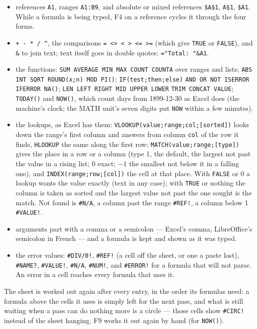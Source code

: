 \begin{itemize}\itemsep0pt
\item references \verb|A1|, ranges \verb|A1:B9|, and absolute or mixed
  references \verb|$A$1|, \verb|A$1|, \verb|$A1|. While a formula is being
  typed, F4 on a reference cycles it through the four forms.
\item \verb|+ - * / ^|, the comparisons \verb|= <> < > <= >=| (which give
  \verb|TRUE| or \verb|FALSE|), and \verb|&| to join text; text itself goes
  in double quotes: \verb|="Total: "&A1|.
\item the functions: \verb|SUM AVERAGE MIN MAX COUNT COUNTA| over ranges
  and lists; \verb|ABS INT SQRT ROUND(x;n) MOD PI()|; \verb|IF(test;then;else)|
  \verb|AND OR NOT ISERROR IFERROR NA()|; \verb|LEN LEFT RIGHT MID UPPER LOWER|
  \verb|TRIM CONCAT VALUE|; \verb|TODAY()| and \verb|NOW()|, which count days
  from 1899-12-30 as Excel does (the machine's clock; the MATH unit's seven
  digits put \verb|NOW| within a few minutes).
\item the lookups, as Excel has them: \verb|VLOOKUP(value;range;col;[sorted])|
  looks down the range's first column and answers from column \verb|col|
  of the row it finds, \verb|HLOOKUP| the same along the first row;
  \verb|MATCH(value;range;[type])| gives the place in a row or a column
  (type 1, the default, the largest not past the value in a rising list;
  0 exact; $-1$ the smallest not below it in a falling one), and
  \verb|INDEX(range;row;[col])| the cell at that place. With \verb|FALSE|
  or 0 a lookup wants the value exactly (text in any case); with \verb|TRUE|
  or nothing the column is taken as sorted and the largest value not past
  the one sought is the match. Not found is \verb|#N/A|, a column past the
  range \verb|#REF!|, a column below 1 \verb|#VALUE!|.
\item arguments part with a comma or a semicolon --- Excel's comma,
  LibreOffice's semicolon in French --- and a formula is kept and shown as
  it was typed.
\item the error values: \verb|#DIV/0!|, \verb|#REF!| (a cell off the sheet,
  or one a paste lost), \verb|#NAME?|, \verb|#VALUE!|, \verb|#N/A|, \verb|#NUM!|,
  and \verb|#ERROR!| for a formula that will not parse. An error in a cell
  reaches every formula that uses it.
\end{itemize}

\noindent The sheet is worked out again after every entry, in the order its
formulas need: a formula above the cells it uses is simply left for the
next pass, and what is still waiting when a pass can do nothing more is a
circle --- those cells show \verb|#CIRC!| instead of the sheet hanging. F9
works it out again by hand (for \verb|NOW()|).

